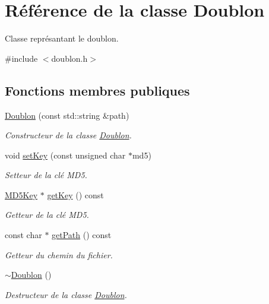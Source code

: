 \hypertarget{class_doublon}{\section{Référence de la classe Doublon}
\label{class_doublon}
}


Classe représantant le doublon.  




{\ttfamily \#include $<$doublon.\-h$>$}

\subsection*{Fonctions membres publiques}
\begin{DoxyCompactItemize}
\item 
\hyperlink{class_doublon_ad1f964eed7fce399af6ea6452fe893ba}{Doublon} (const std\-::string \&path)
\begin{DoxyCompactList}\small\item\em Constructeur de la classe \hyperlink{class_doublon}{Doublon}. \end{DoxyCompactList}\item 
void \hyperlink{class_doublon_a7fcfdaf97e53756e128d5af00a997d85}{set\-Key} (const unsigned char $\ast$md5)
\begin{DoxyCompactList}\small\item\em Setteur de la clé M\-D5. \end{DoxyCompactList}\item 
\hyperlink{class_m_d5_key}{M\-D5\-Key} $\ast$ \hyperlink{class_doublon_a8f2bf2e20ff4dde42d60fc6442454348}{get\-Key} () const 
\begin{DoxyCompactList}\small\item\em Getteur de la clé M\-D5. \end{DoxyCompactList}\item 
const char $\ast$ \hyperlink{class_doublon_ac80da185aafb6f5f5d7241ea8ca59733}{get\-Path} () const 
\begin{DoxyCompactList}\small\item\em Getteur du chemin du fichier. \end{DoxyCompactList}\item 
\hypertarget{class_doublon_a67ab3ff0d90f6eaccd061a12c07ad14b}{\hyperlink{class_doublon_a67ab3ff0d90f6eaccd061a12c07ad14b}{$\sim$\-Doublon} ()}\label{class_doublon_a67ab3ff0d90f6eaccd061a12c07ad14b}

\begin{DoxyCompactList}\small\item\em Destructeur de la classe \hyperlink{class_doublon}{Doublon}. \end{DoxyCompactList}\end{DoxyCompactItemize}


